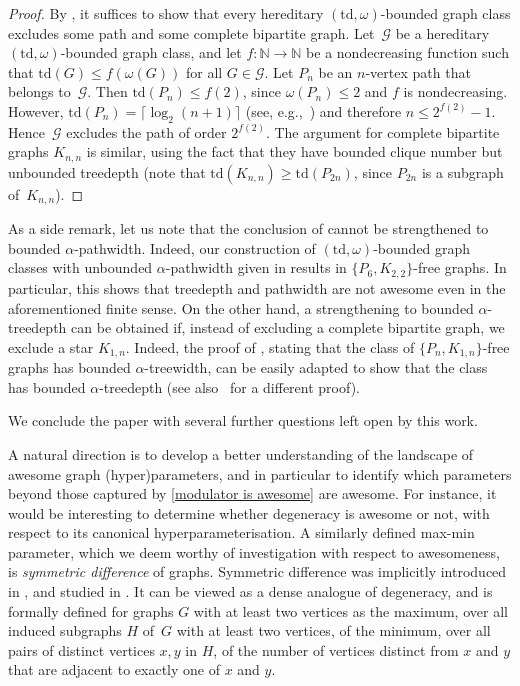 \documentclass[11pt]{article}
\newcommand{\td}{\mathrm{td}}
\theoremstyle{plain}
\theoremstyle{definition}
\theoremstyle{remark}
\numberwithin{equation}{section}
\begin{document}
\begin{proof}
By , it suffices to show that every hereditary $(\td,\omega)$-bounded graph class excludes some path and some complete bipartite graph.
Let~$\mathcal{G}$ be a hereditary $(\td,\omega)$-bounded graph class, and let $f:\mathbb{N}\to \mathbb{N}$ be a nondecreasing function such that $\td(G)\le f(\omega(G))$ for all $G\in \mathcal{G}$.
Let $P_n$ be an $n$-vertex path that belongs to~$\mathcal{G}$.
Then $\td(P_n)\le f(2)$, since $\omega(P_n)\le 2$ and $f$ is nondecreasing.
However, $\td(P_n) = \lceil\log_2(n+1)\rceil$ (see, e.g.,~\cite{MR2920058}) and therefore $n\le 2^{f(2)}-1$.
Hence~$\mathcal{G}$ excludes the path of order $2^{f(2)}$.
The argument for complete bipartite graphs $K_{n,n}$ is similar, using the fact that they have bounded clique number but unbounded treedepth (note that $\td(K_{n,n})\ge \td(P_{2n})$, since $P_{2n}$ is a subgraph of~$K_{n,n}$).
\end{proof}

As a side remark, let us note that the conclusion of  cannot be strengthened to bounded $\alpha$-pathwidth. 
Indeed, our construction of $(\td,\omega)$-bounded graph classes with unbounded $\alpha$-pathwidth given in  results in $\{P_6,K_{2,2}\}$-free graphs.
In particular, this shows that treedepth and pathwidth are not awesome even in the aforementioned finite sense.
On the other hand, a strengthening to bounded $\alpha$-treedepth can be obtained if, instead of excluding a complete bipartite graph, we exclude a star $K_{1,n}$.
Indeed, the proof of \cite[Theorem 1.5]{DKKMMSW2024}, stating that the class of $\{P_n, K_{1,n}\}$-free graphs has bounded $\alpha$-treewidth, can be easily adapted to show that the class has bounded $\alpha$-treedepth (see  also~\cite{choi2025excludinginducedwheelminor} for a different proof).

\medskip
We conclude the paper with several further questions left open by this work.

A natural direction is to develop a better understanding of the landscape of awesome graph (hyper)parameters, and in particular to identify which parameters beyond those captured by \cref{modulator is awesome} are awesome.
For instance, it would be interesting to determine whether degeneracy is awesome or not, with respect to its canonical hyperparameterisation. A similarly defined max-min parameter, which we deem worthy of investigation with respect to awesomeness, is \emph{symmetric difference} of graphs.
Symmetric difference was implicitly introduced in \cite{ACLZ15}, and studied in \cite{AAL21,DLMSZ24,BDSZ24}.
It can be viewed as a dense analogue of degeneracy, and is formally defined for graphs $G$ with at least two vertices as the maximum, over all induced subgraphs $H$ of~$G$ with at least two vertices, of the minimum, over all pairs of distinct vertices $x,y$ in $H$, of the number of vertices distinct from $x$ and $y$ that are adjacent to exactly one of $x$ and $y$.
\end{document}
